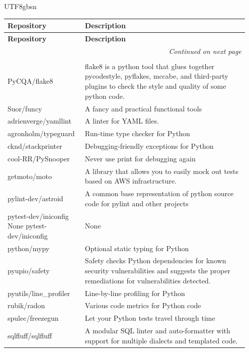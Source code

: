 \begin{CJK*}{UTF8}{gbsn}
\begin{longtable}{p{0.3\linewidth} | p{0.65\linewidth}}
\toprule
\textbf{Repository} & \textbf{Description} \\
\midrule
\endfirsthead

\toprule
\textbf{Repository} & \textbf{Description} \\
\midrule
\endhead

\midrule
\multicolumn{2}{r}{\textit{Continued on next page}} \\
\endfoot

\bottomrule
\endlastfoot

\multicolumn{2}{c}{\textit{Code Quality and Testing}} \\
\midrule
PyCQA/flake8 & flake8 is a python tool that glues together pycodestyle, pyflakes, mccabe, and third-party plugins to check the style and quality of some python code. \\
Suor/funcy & A fancy and practical functional tools \\
adrienverge/yamllint & A linter for YAML files. \\
agronholm/typeguard & Run-time type checker for Python \\
cknd/stackprinter & Debugging-friendly exceptions for Python \\
cool-RR/PySnooper & Never use print for debugging again \\
getmoto/moto & A library that allows you to easily mock out tests based on AWS infrastructure. \\
pylint-dev/astroid & A common base representation of python source code for pylint and other projects \\
pytest-dev/iniconfig None
pytest-dev/iniconfig & None \\
python/mypy & Optional static typing for Python \\
pyupio/safety & Safety checks Python dependencies for known security vulnerabilities and suggests the proper remediations for vulnerabilities detected. \\
pyutils/line\_profiler & Line-by-line profiling for Python \\
rubik/radon & Various code metrics for Python code \\
spulec/freezegun & Let your Python tests travel through time \\
sqlfluff/sqlfluff & A modular SQL linter and auto-formatter with support for multiple dialects and templated code. \\

\end{longtable}
\end{CJK*}
